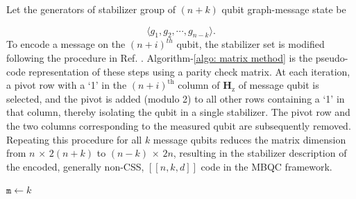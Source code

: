 \documentclass[reprint, amsmath,amssymb, aps,pra,
 floatfix,
]{revtex4-2}
\begin{document}
\noindent Let the generators of stabilizer group of $(n+k)$ qubit graph-message state be

\[
 \langle g_1,g_2, \cdots, g_{n-k} \rangle.
\]
To encode a message on the $(n+i)^{th}$ qubit, the stabilizer set is modified following the procedure in Ref. \cite{patil2023clifford}.
Algorithm-\ref{algo: matrix method} is the pseudo-code representation of these steps using a parity check matrix.
At each iteration, a pivot row with a ‘1’ in the \((n+i)^{\text{th}}\) column of \(\mathbf{H}_\mathrm{z}\) of message qubit is selected, and the pivot is added (modulo 2) to all other rows containing a ‘1’ in that column, thereby isolating the qubit in a single stabilizer.
The pivot row and the two columns corresponding to the measured qubit are subsequently removed. Repeating this procedure for all $k$ message qubits reduces the matrix dimension from $n$ $\times$ $2(n+k)$ to $(n-k)$ $\times$ $2n$, resulting in the stabilizer description of the encoded, generally non-CSS,  $[[n,k,d]]$ code in the MBQC framework.\\
{\linespread{1.05}\selectfont
\begin{algorithm}[H]
\DontPrintSemicolon
\caption{Graph code stabilizer construction via parity check matrix using measurements}
\label{algo: matrix method}



$\mathtt{m} \gets k$\;
\end{algorithm}
}
\end{document}
